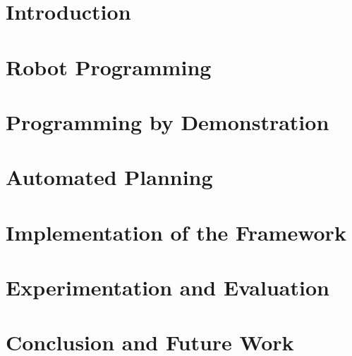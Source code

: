 \documentclass[a4paper,12pt,twoside]{book}
\theoremstyle{definition}
\theoremstyle{remark}
\begin{document}
%
\tableofcontents
\listoffigures

\chapter{Introduction} \label{chap:Intro}


\chapter{Robot Programming}\label{chap:Sota}

\chapter{Programming by Demonstration}\label{chap:Sota-PbD}


\chapter{Automated Planning}\label{chap:Sota-AP}


\label{chap:Contribution}

\chapter{Implementation of the Framework}\label{chap:Implementation}


\chapter{Experimentation and Evaluation}\label{chap:Evaluation}


\chapter{Conclusion and Future Work}\label{chap:Conclusion}



\clearpage


\end{document}
